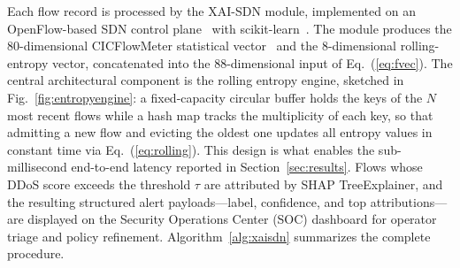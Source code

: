 ﻿\documentclass[journal]{IEEEtran}
\begin{document}
Each flow record is processed by the XAI-SDN module, implemented on an OpenFlow-based SDN control plane~\cite{mckeown2008openflow} with scikit-learn~\cite{pedregosa2011sklearn}. The module produces the 80-dimensional CICFlowMeter statistical vector~\cite{sharafaldin2018cicids} and the 8-dimensional rolling-entropy vector, concatenated into the 88-dimensional input of Eq.~(\ref{eq:fvec}). The central architectural component is the rolling entropy engine, sketched in Fig.~\ref{fig:entropyengine}: a fixed-capacity circular buffer holds the keys of the $N$ most recent flows while a hash map tracks the multiplicity of each key, so that admitting a new flow and evicting the oldest one updates all entropy values in constant time via Eq.~(\ref{eq:rolling}). This design is what enables the sub-millisecond end-to-end latency reported in Section~\ref{sec:results}. Flows whose DDoS score exceeds the threshold $\tau$ are attributed by SHAP TreeExplainer, and the resulting structured alert payloads---label, confidence, and top attributions---are displayed on the Security Operations Center (SOC) dashboard for operator triage and policy refinement. Algorithm~\ref{alg:xaisdn} summarizes the complete procedure.
\end{document}
